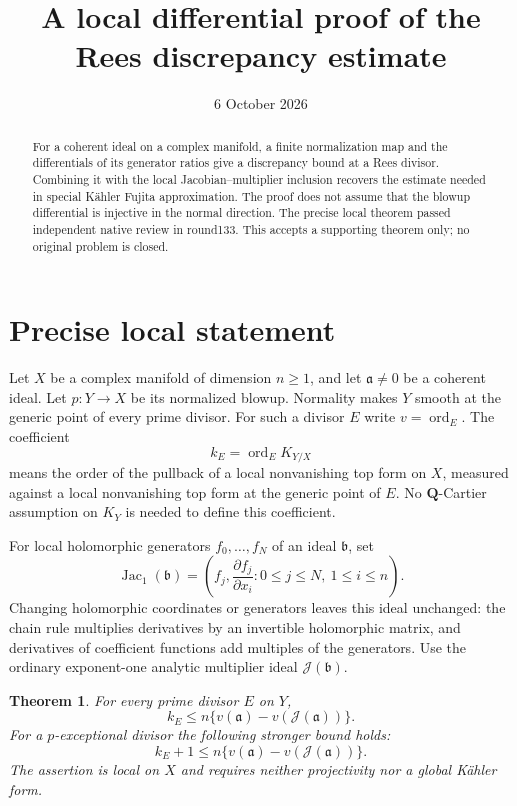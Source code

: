 \documentclass[11pt]{article}
\title{A local differential proof of the Rees discrepancy estimate}
\author{}
\date{6 October 2026}
\newcommand{\Jac}{\operatorname{Jac}}
\newcommand{\ord}{\operatorname{ord}}
\newcommand{\J}{\mathcal J}
\newtheorem{theorem}{Theorem}
\begin{document}
\maketitle

\begin{abstract}
For a coherent ideal on a complex manifold, a finite normalization map
and the differentials of its generator ratios give a discrepancy bound
at a Rees divisor. Combining it with the local Jacobian--multiplier
inclusion recovers the estimate needed in special K\"ahler Fujita
approximation. The proof does not assume that the blowup differential
is injective in the normal direction. The precise local theorem passed independent native review in round133.
This accepts a supporting theorem only; no original problem is closed.
\end{abstract}

\section{Precise local statement}

Let $X$ be a complex manifold of dimension $n\geq1$, and let
$\mathfrak a\ne0$ be a coherent ideal. Let
$p:Y\to X$ be its normalized blowup. Normality makes $Y$ smooth
at the generic point of every prime divisor. For such a divisor
$E$ write $v=\ord_E$. The coefficient
\[
 k_E=\ord_E K_{Y/X}
\]
means the order of the pullback of a local nonvanishing top form
on $X$, measured against a local nonvanishing top form at the
generic point of $E$. No $\mathbf Q$-Cartier assumption on
$K_Y$ is needed to define this coefficient.

For local holomorphic generators $f_0,\ldots,f_N$ of an ideal
$\mathfrak b$, set
\[
 \Jac_1(\mathfrak b)=
 \left(f_j,\frac{\partial f_j}{\partial x_i}:
              0\leq j\leq N,\ 1\leq i\leq n\right).
 \tag{1}
\]
Changing holomorphic coordinates or generators leaves this
ideal unchanged: the chain rule multiplies derivatives by an
invertible holomorphic matrix, and derivatives of coefficient
functions add multiples of the generators.
Use the ordinary exponent-one analytic multiplier ideal
$\J(\mathfrak b)$.

\begin{theorem}
For every prime divisor $E$ on $Y$,
\[
 k_E\leq n\{v(\mathfrak a)-v(\J(\mathfrak a))\}.
 \tag{2}
\]
For a $p$-exceptional divisor the following stronger bound holds:
\[
 k_E+1\leq n\{v(\mathfrak a)-v(\J(\mathfrak a))\}.
 \tag{3}
\]
The assertion is local on $X$ and requires neither projectivity
nor a global K\"ahler form.
\end{theorem}
\end{document}
